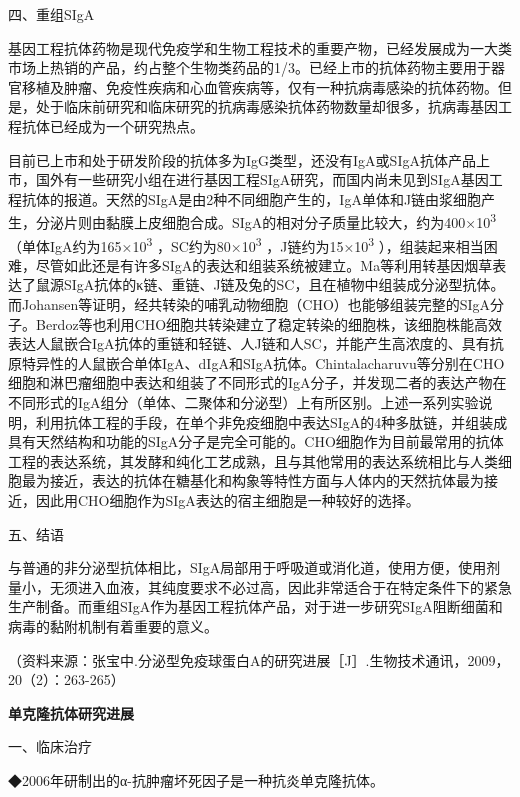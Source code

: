 \begin{center}
{\large 四、重组SIgA}
\end{center}
基因工程抗体药物是现代免疫学和生物工程技术的重要产物，已经发展成为一大类市场上热销的产品，约占整个生物类药品的1/3。已经上市的抗体药物主要用于器官移植及肿瘤、免疫性疾病和心血管疾病等，仅有一种抗病毒感染的抗体药物。但是，处于临床前研究和临床研究的抗病毒感染抗体药物数量却很多，抗病毒基因工程抗体已经成为一个研究热点。

目前已上市和处于研发阶段的抗体多为IgG类型，还没有IgA或SIgA抗体产品上市，国外有一些研究小组在进行基因工程SIgA研究，而国内尚未见到SIgA基因工程抗体的报道。天然的SIgA是由2种不同细胞产生的，IgA单体和J链由浆细胞产生，分泌片则由黏膜上皮细胞合成。SIgA的相对分子质量比较大，约为400×10\textsuperscript{3}
（单体IgA约为165×10\textsuperscript{3} ，SC约为80×10\textsuperscript{3}
，J链约为15×10\textsuperscript{3}
），组装起来相当困难，尽管如此还是有许多SIgA的表达和组装系统被建立。Ma等利用转基因烟草表达了鼠源SIgA抗体的κ链、重链、J链及兔的SC，且在植物中组装成分泌型抗体。而Johansen等证明，经共转染的哺乳动物细胞（CHO）也能够组装完整的SIgA分子。Berdoz等也利用CHO细胞共转染建立了稳定转染的细胞株，该细胞株能高效表达人鼠嵌合IgA抗体的重链和轻链、人J链和人SC，并能产生高浓度的、具有抗原特异性的人鼠嵌合单体IgA、dIgA和SIgA抗体。Chintalacharuvu等分别在CHO细胞和淋巴瘤细胞中表达和组装了不同形式的IgA分子，并发现二者的表达产物在不同形式的IgA组分（单体、二聚体和分泌型）上有所区别。上述一系列实验说明，利用抗体工程的手段，在单个非免疫细胞中表达SIgA的4种多肽链，并组装成具有天然结构和功能的SIgA分子是完全可能的。CHO细胞作为目前最常用的抗体工程的表达系统，其发酵和纯化工艺成熟，且与其他常用的表达系统相比与人类细胞最为接近，表达的抗体在糖基化和构象等特性方面与人体内的天然抗体最为接近，因此用CHO细胞作为SIgA表达的宿主细胞是一种较好的选择。

\begin{center}
{\large 五、结语}
\end{center}
与普通的非分泌型抗体相比，SIgA局部用于呼吸道或消化道，使用方便，使用剂量小，无须进入血液，其纯度要求不必过高，因此非常适合于在特定条件下的紧急生产制备。而重组SIgA作为基因工程抗体产品，对于进一步研究SIgA阻断细菌和病毒的黏附机制有着重要的意义。

（资料来源：张宝中.分泌型免疫球蛋白A的研究进展［J］.生物技术通讯，2009，20（2）：263-265）

\begin{center}
\textbf{\Large 单克隆抗体研究进展}
\end{center}
\begin{center}
{\large 一、临床治疗}
\end{center}
◆2006年研制出的α-抗肿瘤坏死因子是一种抗炎单克隆抗体。

